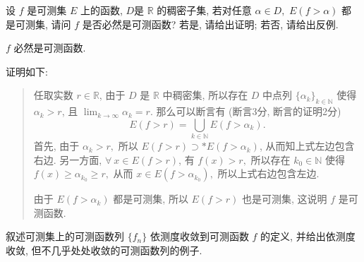 \begin{question}[points = 10]
  设 $f$ 是可测集 $E$ 上的函数, $D$是 $\mathbb{R}$ 的稠密子集, 若对任意 $\alpha\in D,$ $E(f > \alpha)$ 都是可测集, 请问 $f$ 是否必然是可测函数? 若是, 请给出证明; 若否, 请给出反例.

\end{question}

\begin{solution}
  \(f\) 必然是可测函数. 

  证明如下: 

  \begin{quote}
  任取实数 \(r \in \mathbb{R}\), 由于 \(D\) 是 \(\mathbb{R}\) 中稠密集, 所以存在 \(D\) 中点列 \(\{\alpha_k\}_{k \in \mathbb{N}}\) 使得 \(\alpha_k > r\), 且 \(\displaystyle \lim_{k \to \infty} \alpha_k = r\). 那么可以断言有 (断言3分, 断言的证明2分)
  \[E(f > r) = \bigcup_{k \in \mathbb{N}} E(f > \alpha_k).\]
  首先, 由于 \(\alpha_k > r,\) 所以 \(E(f > r) \supset* E(f > \alpha_k)\), 从而知上式左边包含右边. 另一方面, \(\forall ~ x \in E(f > r)\), 有 \(f(x) > r,\) 所以存在 \(k_0 \in \mathbb{N}\) 使得 \(f(x) \geqslant \alpha_{k_0} \geqslant r,\) 从而 \(x \in E(f > \alpha_{k_0}),\) 所以上式右边包含左边.

  由于 \(E(f > \alpha_k)\) 都是可测集, 所以 \(E(f > r)\) 也是可测集, 这说明 \(f\) 是可测函数.
  \end{quote}
\end{solution}

\begin{question}[points = 10]
  叙述可测集上的可测函数列 $\{f_n\}$ 依测度收敛到可测函数 $f$ 的定义, 并给出依测度收敛, 但不几乎处处收敛的可测函数列的例子.

\end{question}

